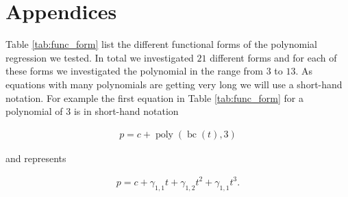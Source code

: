 \documentclass[12pt,a4paper]{article}
\DeclareMathOperator{\bc}{bc}
\DeclareMathOperator{\poly}{poly}
\begin{document}
\cleardoublepage
\appendix
\setcounter{table}{0}
\setcounter{figure}{0}
\renewcommand{\thetable}{A\arabic{table}}
\renewcommand{\thefigure}{A\arabic{figure}}


\hypertarget{appendices}{%
\section{Appendices}\label{appendices}}

Table \ref{tab:func_form} list the different functional forms of the
polynomial regression we tested. In total we investigated \(21\)
different forms and for each of these forms we investigated the
polynomial in the range from \(3\) to \(13\). As equations with many
polynomials are getting very long we will use a short-hand notation. For
example the first equation in Table \ref{tab:func_form} for a polynomial
of \(3\) is in short-hand notation

\begin{align}
    p = c + \poly\left( \bc(t), 3 \right)
\end{align}

and represents

\begin{align}
    p = c + \gamma_{1,1} t + \gamma_{1,2} t^2 + \gamma_{1,1} t^3 .
\end{align}
\end{document}
